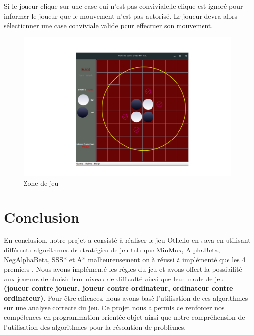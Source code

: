 \documentclass[12pt]{article}
\begin{document}
Si le joueur clique sur une case qui n'est pas conviviale,le clique est ignoré pour informer le joueur que le mouvement n'est pas autorisé.
Le joueur devra alors sélectionner une case conviviale valide pour effectuer son mouvement.
	\begin{figure}[H]
	\centering
	\includegraphics[scale=0.3]{img/zone.png}
	\caption{Zone de jeu}
	\label{zone}
\end{figure}
	
	
	
	
	
	
	
	
	
	
	
	
	
	
	
	
	
	
	
	
	
	
	
	
	
	
	\section{Conclusion}
En conclusion, notre projet a consisté à réaliser le jeu Othello en Java en utilisant différents algorithmes de stratégies de jeu tels que MinMax, AlphaBeta, NegAlphaBeta, SSS* et A* malheureusement on à réussi à implémenté que les 4 premiers . Nous avons implémenté les règles du jeu et avons offert la possibilité aux joueurs de choisir leur niveau de difficulté ainsi que leur mode de jeu \textbf{(joueur contre joueur, joueur contre ordinateur, ordinateur contre ordinateur)}. Pour être efficaces, nous avons basé l'utilisation de ces algorithmes sur une analyse correcte du jeu. Ce projet nous a permis de renforcer nos compétences en programmation orientée objet ainsi que notre compréhension de l'utilisation des algorithmes pour la résolution de problèmes.
\end{document}
